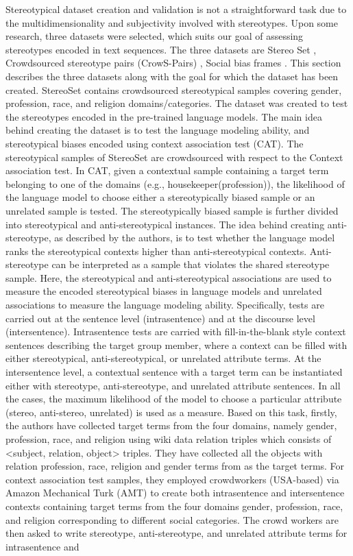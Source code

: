 Stereotypical dataset creation and validation is not a straightforward task due to the multidimensionality and subjectivity involved with stereotypes. Upon some research, three datasets were selected, which suits our goal of assessing stereotypes encoded in text sequences. The three datasets are Stereo Set \cite{nadeem2020stereoset}, Crowdsourced stereotype pairs (CrowS-Pairs) \cite{nangia2020crows}, Social bias frames \cite{sap2019social}. This section describes the three datasets along with the goal for which the dataset has been created. StereoSet \cite{nadeem2020stereoset} contains crowdsourced stereotypical samples covering gender, profession, race, and religion domains/categories. The dataset was created to test the stereotypes encoded in the pre-trained language models. The main idea behind creating the dataset is to test the language modeling ability, and stereotypical biases encoded using context association test (CAT). The stereotypical samples of StereoSet are crowdsourced with respect to the Context association test. In CAT, given a contextual sample containing a target term belonging to one of the domains (e.g., housekeeper(profession)), the likelihood of the language model to choose either a stereotypically biased sample or an unrelated sample is tested. The stereotypically biased sample is further divided into stereotypical and anti-stereotypical instances. The idea behind creating anti-stereotype, as described by the authors, is to test whether the language model ranks the stereotypical contexts higher than anti-stereotypical contexts. Anti-stereotype can be interpreted as a sample that violates the shared stereotype sample. Here, the stereotypical and anti-stereotypical associations are used to measure the encoded stereotypical biases in language models and unrelated associations to measure the language modeling ability. Specifically, tests are carried out at the sentence level (intrasentence) and at the discourse level (intersentence). Intrasentence tests are carried with fill-in-the-blank style context sentences describing the target group member, where a context can be filled with either stereotypical, anti-stereotypical, or unrelated attribute terms. At the intersentence level, a contextual sentence with a target term can be instantiated either with stereotype, anti-stereotype, and unrelated attribute sentences. In all the cases, the maximum likelihood of the model to choose a particular attribute (stereo, anti-stereo, unrelated) is used as a measure. Based on this task, firstly, the authors have collected target terms from the four domains, namely gender, profession, race, and religion using wiki data relation triples \cite{vrandevcic2014wikidata} which consists of <subject, relation, object> triples. They have collected all the objects with relation profession, race, religion and gender terms from \cite{nosek2002math} as the target terms. For context association test samples, they employed crowdworkers (USA-based) via Amazon Mechanical Turk (AMT) to create both intrasentence and intersentence contexts containing target terms from the four domains gender, profession, race, and religion corresponding to different social categories. The crowd workers are then asked to write stereotype, anti-stereotype, and unrelated attribute terms for intrasentence and 